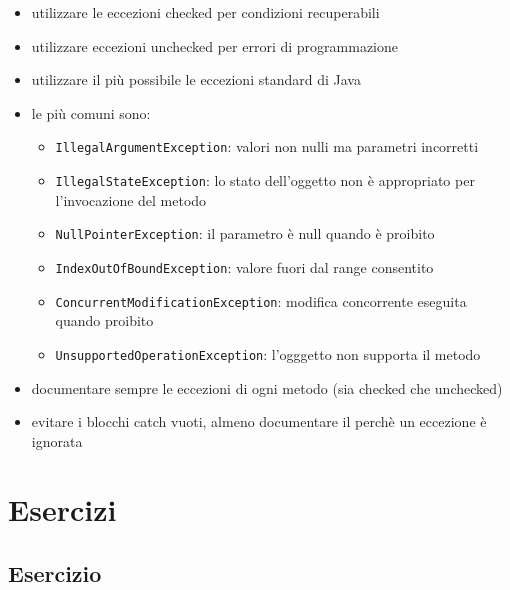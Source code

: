 \documentclass{article}
\begin{document}
\begin{itemize}
\item utilizzare le eccezioni checked per condizioni recuperabili 
\item utilizzare eccezioni unchecked per errori di programmazione
\end{itemize}
\begin{itemize}
\item utilizzare il pi\`u possibile le eccezioni standard di Java
\item le pi\`u comuni sono:
\begin{itemize}
\item \texttt{IllegalArgumentException}: valori non nulli ma parametri incorretti
\item \texttt{IllegalStateException}: lo stato dell'oggetto non \`e appropriato per l'invocazione del metodo 
\item \texttt{NullPointerException}: il parametro \`e null quando \`e proibito
\item \texttt{IndexOutOfBoundException}: valore fuori dal range consentito
\item \texttt{ConcurrentModificationException}: modifica concorrente eseguita quando proibito
\item \texttt{UnsupportedOperationException}: l'ogggetto non supporta il metodo
\end{itemize}
\end{itemize}
\begin{itemize}
\item  documentare sempre le eccezioni di ogni metodo (sia checked che unchecked)
 \end{itemize}


\begin{itemize}
\item  evitare i blocchi catch vuoti, almeno documentare il perch\`e un eccezione \`e ignorata
 \end{itemize}






\section{Esercizi}

\subsection{Esercizio}
\end{document}
